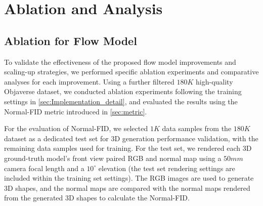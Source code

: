 \section{Ablation and Analysis}

\begin{table}[t]
\begin{center}
\caption{The ablation for flow model improvements. `Skip-C' is the skip-connection operation and `Sample-S' is the sample schedule.}
\vspace{1em}
\label{tab: diffusion_improvements_abaltion}
\begin{sc}
\end{sc}
\end{center}
\vspace{-2em}
\end{table}
\subsection{Ablation for Flow Model}


To validate the effectiveness of the proposed flow model improvements and scaling-up strategies, we performed specific ablation experiments and comparative analyses for each improvement.
Using a further filtered $180K$ high-quality Objaverse dataset, we conducted ablation experiments following the training settings in \ref{sec:Implementation_detail}, and evaluated the results using the Normal-FID metric introduced in \ref{sec:metric}.

For the evaluation of Normal-FID, we selected $1K$ data samples from the $180K$ dataset as a dedicated test set for 3D generation performance validation, with the remaining data samples used for training. For the test set, we rendered each 3D ground-truth model's front view paired RGB and normal map using a $50mm$ camera focal length and a $10^\circ$ elevation (the test set rendering settings are included within the training set settings). The RGB images are used to generate 3D shapes, and the normal maps are compared with the normal maps rendered from the generated 3D shapes to calculate the Normal-FID.

